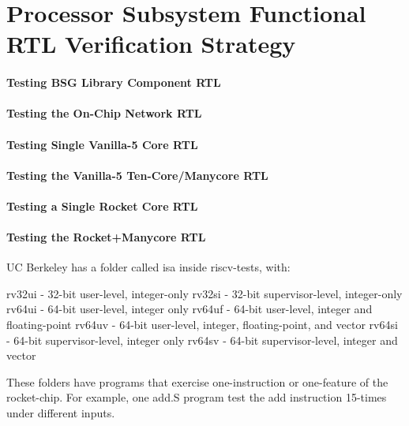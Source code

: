 
\section{Processor Subsystem Functional RTL Verification Strategy}

\paragraph{Testing BSG Library Component RTL}

\paragraph{Testing the On-Chip Network RTL}

\paragraph{Testing Single Vanilla-5 Core RTL}

\paragraph{Testing the Vanilla-5 Ten-Core/Manycore RTL}

\paragraph{Testing a Single Rocket Core RTL}

\paragraph{Testing the Rocket+Manycore RTL}


UC Berkeley has a folder called isa inside riscv-tests, with:

rv32ui - 32-bit user-level, integer-only
rv32si - 32-bit supervisor-level, integer-only
rv64ui - 64-bit user-level, integer only
rv64uf - 64-bit user-level, integer and floating-point
rv64uv - 64-bit user-level, integer, floating-point, and vector
rv64si - 64-bit supervisor-level, integer only
rv64sv - 64-bit supervisor-level, integer and vector

These folders have programs that exercise one-instruction or one-feature of
the rocket-chip. For example, one add.S program test the add instruction
15-times under different inputs.

